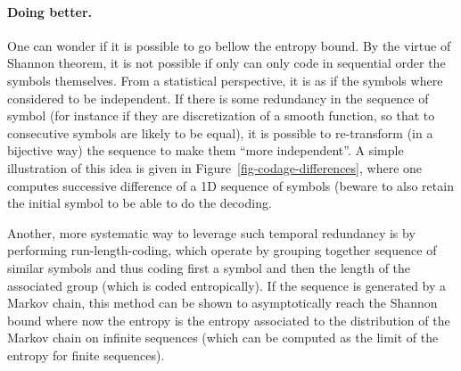 \paragraph{Doing better.}

One can wonder if it is possible to go bellow the entropy bound. By the virtue of Shannon theorem, it is not possible if only can only code in sequential order the symbols themselves. From a statistical perspective, it is as if the symbols where considered to be independent. If there is some redundancy in the sequence of symbol (for instance if they are discretization of a smooth function, so that to consecutive symbols are likely to be equal), it is possible to re-transform (in a bijective way) the sequence to make them ``more independent''. A simple illustration of this idea is given in Figure~\ref{fig-codage-differences}, where one computes successive difference of a 1D sequence of symbols (beware to also retain the initial symbol to be able to do the decoding.


Another, more systematic way to leverage such temporal redundancy is by performing run-length-coding, which operate by grouping together sequence of similar symbols and thus coding first a symbol and then the length of the associated group (which is coded entropically). If the sequence is generated by a Markov chain, this method can be shown to asymptotically reach the Shannon bound where now the entropy is the entropy associated to the distribution of the Markov chain on infinite sequences (which can be computed as the limit of the entropy for finite sequences).



